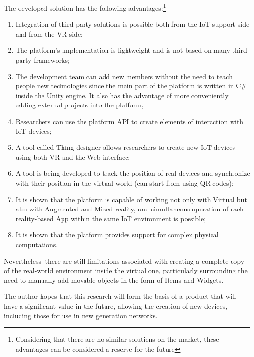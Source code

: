 The developed solution has the following advantages:\footnote{Considering that there are no similar solutions on the market, these advantages can be considered a reserve for the future}
\begin{enumerate}
    \item Integration of third-party solutions is possible both from the IoT support side and from the VR side;
    \item The platform's implementation is lightweight and is not based on many third-party frameworks;
    \item The development team can add new members without the need to teach people new technologies since the main part of the platform is written in C\# inside the Unity engine. It also has the advantage of more conveniently adding external projects into the platform;
    \item Researchers can use the platform API to create elements of interaction with IoT devices;
    \item A tool called Thing designer allows researchers to create new IoT devices using both VR and the Web interface;
    \item A tool is being developed to track the position of real devices and synchronize with their position in the virtual world (can start from using QR-codes);
    \item It is shown that the platform is capable of working not only with Virtual but also with Augmented and Mixed reality, and simultaneous operation of each reality-based App within the same IoT environment is possible;
    \item It is shown that the platform provides support for complex physical computations.
\end{enumerate}

Nevertheless, there are still limitations associated with creating a complete copy of the real-world environment inside the virtual one, particularly surrounding the need to manually add movable objects in the form of Items and Widgets.

The author hopes that this research will form the basis of a product that will have a significant value in the future, allowing the creation of new devices, including those for use in new generation networks.